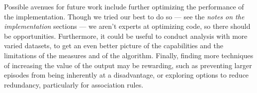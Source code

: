 Possible avenues for future work include further optimizing the performance of the implementation. Though we tried our best to do so --- see the \emph{notes on the implementation} sections --- we aren't experts at optimizing code, so there should be opportunities. Furthermore, it could be useful to conduct analysis with more varied datasets, to get an even better picture of the capabilities and the limitations of the measures and of the algorithm. Finally, finding more techniques of increasing the value of the output may be rewarding, such as preventing larger episodes from being inherently at a disadvantage, or exploring options to reduce redundancy, particularly for association rules.
